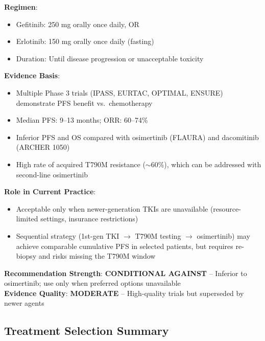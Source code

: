 \documentclass[10pt,letterpaper]{article}
\begin{document}
\vspace{3pt}

\begin{tcolorbox}[enhanced,colback=highlightgray,colframe=black,
title={\textbf{Option 5: Gefitinib / Erlotinib (1st-Generation EGFR TKI)} \hfill \colorbox{white}{\textbf{NOT PREFERRED (2B)}}},
fonttitle=\bfseries\small,coltitle=black]
{\small
\textbf{Regimen}:
\begin{itemize}
\item Gefitinib: 250 mg orally once daily, OR
\item Erlotinib: 150 mg orally once daily (fasting)
\item Duration: Until disease progression or unacceptable toxicity
\end{itemize}

\textbf{Evidence Basis}:
\begin{itemize}
\item Multiple Phase 3 trials (IPASS, EURTAC, OPTIMAL, ENSURE) demonstrate PFS benefit vs.~chemotherapy
\item Median PFS: 9--13 months; ORR: 60--74\%
\item Inferior PFS and OS compared with osimertinib (FLAURA) and dacomitinib (ARCHER 1050)
\item High rate of acquired T790M resistance ($\sim$60\%), which can be addressed with second-line osimertinib
\end{itemize}

\textbf{Role in Current Practice}:
\begin{itemize}
\item Acceptable only when newer-generation TKIs are unavailable (resource-limited settings, insurance restrictions)
\item Sequential strategy (1st-gen TKI $\rightarrow$ T790M testing $\rightarrow$ osimertinib) may achieve comparable cumulative PFS in selected patients, but requires re-biopsy and risks missing the T790M window
\end{itemize}

\textbf{Recommendation Strength}: \textbf{CONDITIONAL AGAINST} -- Inferior to osimertinib; use only when preferred options unavailable\\
\textbf{Evidence Quality}: \textbf{MODERATE} -- High-quality trials but superseded by newer agents
}
\end{tcolorbox}

\vspace{3pt}

\subsection{Treatment Selection Summary}
\end{document}
